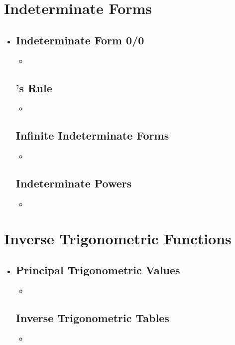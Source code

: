 \section{Indeterminate Forms}
\begin{itemize}
  \item []

  \subsection{Indeterminate Form 0/0}
  \begin{itemize}
    \item
  \end{itemize}

  \subsection{\hopital's Rule}
  \begin{itemize}
    \item
  \end{itemize}

  \subsection{Infinite Indeterminate Forms}
  \begin{itemize}
    \item
  \end{itemize}

  \subsection{Indeterminate Powers}
  \begin{itemize}
    \item
  \end{itemize}

\end{itemize}

\section{Inverse Trigonometric Functions}
\begin{itemize}
  \item []

  \subsection{Principal Trigonometric Values}
  \begin{itemize}
    \item
  \end{itemize}

  \subsection{Inverse Trigonometric Tables}
  \begin{itemize}
    \item
  \end{itemize}


\end{itemize}

